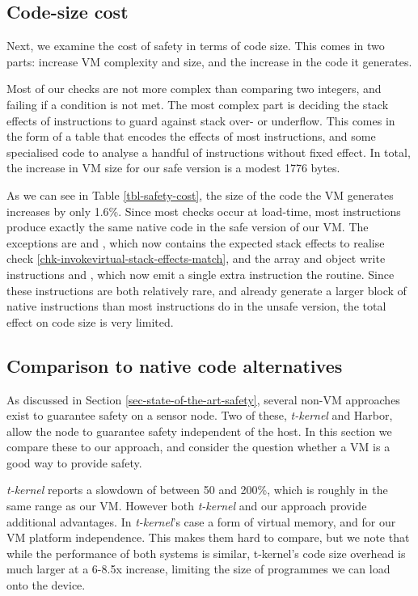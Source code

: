 \subsection{Code-size cost}
Next, we examine the cost of safety in terms of code size. This comes in two parts: increase VM complexity and size, and the increase in the code it generates.

Most of our checks are not more complex than comparing two integers, and failing if a condition is not met. The most complex part is deciding the stack effects of instructions to guard against stack over- or underflow. This comes in the form of a table that encodes the effects of most instructions, and some specialised code to analyse a handful of instructions without fixed effect. In total, the increase in VM size for our safe version is a modest 1776 bytes.

As we can see in Table \ref{tbl-safety-cost}, the size of the code the VM generates increases by only 1.6\%. Since most checks occur at load-time, most instructions produce exactly the same native code in the safe version of our VM. The exceptions are  and , which now contains the expected stack effects to realise check \ref{chk-invokevirtual-stack-effects-match}, and the array and object write instructions  and , which now emit a single extra  instruction the  routine. Since these instructions are both relatively rare, and already generate a larger block of native instructions than most instructions do in the unsafe version, the total effect on code size is very limited.

\subsection{Comparison to native code alternatives}
As discussed in Section \ref{sec-state-of-the-art-safety}, several non-VM approaches exist to guarantee safety on a sensor node. Two of these, \emph{t-kernel} and Harbor, allow the node to guarantee safety independent of the host. In this section we compare these to our approach, and consider the question whether a VM is a good way to provide safety.

\emph{t-kernel} reports a slowdown of between 50 and 200\%, which is roughly in the same range as our VM. However both \emph{t-kernel} and our approach provide additional advantages. In \emph{t-kernel}'s case a form of virtual memory, and for our VM platform independence. This makes them hard to compare, but we note that while the performance of both systems is similar, t-kernel's code size overhead is much larger at a 6-8.5x increase, limiting the size of programmes we can load onto the device.


